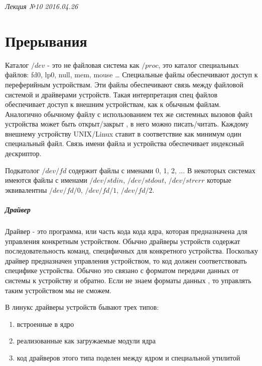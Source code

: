 \clearpage
\begin{flushright}
	\textit{Лекция №10}
	\textit{2016.04.26}
\end{flushright}

\chapter{Прерывания}

Каталог $/dev$ - это не файловая система как $/proc$, это каталог специальных файлов: fd0, lp0, null, mem, mouse … Специальные файлы обеспечивают доступ к переферийным устройствам. Эти файлы обеспечивают связь между файловой системой и драйверами устройств. Такая интерпретация спец файлов обеспечивает доступ к внешним устройствам, как к обычным файлам. Аналогично обычному файлу с использованием тех же системных вызовов файл устройства может быть открыт/закрыт , в него можно писать/читать. Каждому внешнему устройству UNIX/Linux ставит в соответствие как минимум один специальный файл. Связь имени файла и устройства обеспечивает индексный дескриптор.

Подкатолог $/dev/fd$ содержит файлы с именами 0, 1, 2, ... В некоторых системах имеются файлы с именами
$/dev/stdin$, $/dev/stdout$, $/dev/strerr$ которые эквивалентны $/dev/fd/0$, $/dev/fd/1$, $/dev/fd/2$.

\paragraph{Драйвер}

Драйвер - это программа, или часть кода кода ядра, которая предназначена для управления конкретным устройством. Обычно драйверы устройств содержат последовательность команд, специфичных для конкретного устройства. Поскольку драйвер предназначен управления устройством, то код должен соответствовать специфике устройства. Обычно это связано с форматом передачи данных от системы к устройству и обратно. Если не знаем форматы данных , то управлять таким устройством мы не сможем.

В линукс драйверы устройств бывают трех типов:
\begin{enumerate}
	\item встроенные в ядро
	\item реализованные как загружаемые модули ядра
	\item код драйверов этого типа поделен между ядром и специальной утилитой
\end{enumerate}

